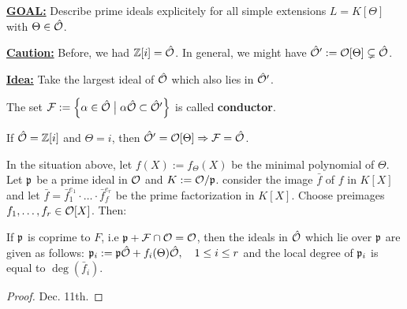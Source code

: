 \bigskip

\textbf{\underline{GOAL:}} Describe prime ideals explicitely for all simple extensions $L = K[\Theta]$ with $\Theta \in \hat{\mathcal{O}}$.

\textbf{\underline{Caution:}} Before, we had $\mathbb{Z}[i] = \hat{\mathcal{O}}$. In general, we might have $\hat{\mathcal{O}}' := \mathcal{O}[\Theta] \subsetneq \hat{\mathcal{O}}$.

\textbf{\underline{Idea:}} Take the largest ideal of $\hat{\mathcal{O}}$ which also lies in $\hat{\mathcal{O}}'$.

\begin{defi}
	The set $\mathcal{F} := \left\{ {\alpha \in \hat{\mathcal{O}}} \bigm| {\alpha\hat{\mathcal{O}} \subset \hat{\mathcal{O}}'} \right\}$ is called \textbf{conductor}.
\end{defi}

\begin{Bsp}
	If $\hat{\mathcal{O}} = \mathbb{Z}[i]$ and $\Theta = i$, then $\hat{\mathcal{O}}' = \mathcal{O}[\Theta] \Rightarrow \mathcal{F} = \hat{\mathcal{O}}$.
\end{Bsp}

\begin{Prop}
	In the situation above, let $f(X) := f_\Theta(X)$ be the minimal polynomial of $\Theta$. Let $\mathfrak{p}$ be a prime ideal in $\mathcal{O}$ and $K := \mathcal{O} / \mathfrak{p}$. consider the image $\bar f$ of $f$ in $K[X]$ and let $\bar f = \bar f_1^{e_1} \cdot \dots \cdot \bar f_f^{e_r}$ be the prime factorization in $K[X]$. Choose preimages $f_1, \dots, f_r \in \mathcal{O}[X]$. Then:
	
	If $\mathfrak{p}$ is coprime to $F$, i.e $\mathfrak{p} + \mathcal{F} \cap \mathcal{O} = \mathcal{O}$, then the ideals in $\hat{\mathcal{O}}$ which lie over $\mathfrak{p}$ are given as follows: $\mathfrak{p}_i := \mathfrak{p}\hat{\mathcal{O}} + f_i(\Theta) \hat{\mathcal{O}}, \quad 1 \leq i \leq r$ and the local degree of $\mathfrak{p}_i$ is equal to $\deg(\bar f_i)$.
\end{Prop}
\begin{proof}
	Dec. 11th.
\end{proof}